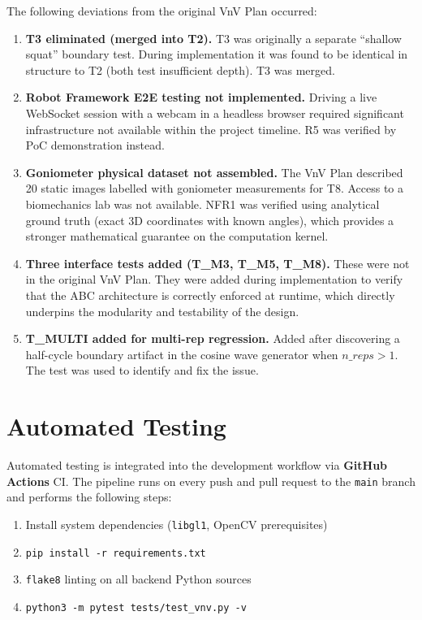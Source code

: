 \documentclass[12pt, titlepage]{article}
\begin{document}
The following deviations from the original VnV Plan occurred:

\begin{enumerate}

  \item \textbf{T3 eliminated (merged into T2).} T3 was originally a separate
    ``shallow squat'' boundary test. During implementation it was found to be
    identical in structure to T2 (both test insufficient depth). T3 was merged.

  \item \textbf{Robot Framework E2E testing not implemented.} Driving a live
    WebSocket session with a webcam in a headless browser required significant
    infrastructure not available within the project timeline. R5 was verified
    by PoC demonstration instead.

  \item \textbf{Goniometer physical dataset not assembled.} The VnV Plan
    described 20 static images labelled with goniometer measurements for T8.
    Access to a biomechanics lab was not available. NFR1 was verified using
    analytical ground truth (exact 3D coordinates with known angles), which
    provides a stronger mathematical guarantee on the computation kernel.

  \item \textbf{Three interface tests added (T\_M3, T\_M5, T\_M8).} These
    were not in the original VnV Plan. They were added during implementation
    to verify that the ABC architecture is correctly enforced at runtime,
    which directly underpins the modularity and testability of the design.

  \item \textbf{T\_MULTI added for multi-rep regression.} Added after
    discovering a half-cycle boundary artifact in the cosine wave generator
    when $n\_reps > 1$. The test was used to identify and fix the issue.

\end{enumerate}

\section{Automated Testing}
\label{sec:auto}

Automated testing is integrated into the development workflow via
\textbf{GitHub Actions} CI. The pipeline runs on every push and pull request
to the \texttt{main} branch and performs the following steps:

\begin{enumerate}
  \item Install system dependencies (\texttt{libgl1}, OpenCV prerequisites)
  \item \texttt{pip install -r requirements.txt}
  \item \texttt{flake8} linting on all backend Python sources
  \item \texttt{python3 -m pytest tests/test\_vnv.py -v}
\end{enumerate}
\end{document}
